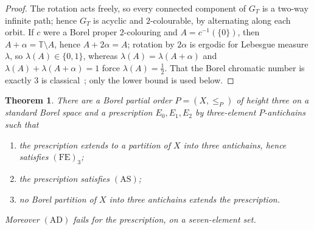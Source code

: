 \documentclass[11pt,reqno]{amsart}
\theoremstyle{plain}
\newtheorem{theorem}{Theorem}[section]
\theoremstyle{definition}
\theoremstyle{remark}
\newcommand{\T}{\mathbb T}
\begin{document}
\begin{proof}
The rotation acts freely, so every connected component of $G_T$ is a two-way
infinite path; hence $G_T$ is acyclic and $2$-colourable, by alternating along
each orbit. If $c$ were a Borel proper $2$-colouring and $A=c^{-1}(\{0\})$,
then $A+\alpha=\T\setminus A$, hence $A+2\alpha=A$; rotation by $2\alpha$ is
ergodic for Lebesgue measure $\lambda$, so $\lambda(A)\in\{0,1\}$, whereas
$\lambda(A)=\lambda(A+\alpha)$ and $\lambda(A)+\lambda(A+\alpha)=1$ force
$\lambda(A)=\tfrac12$. That the Borel chromatic number is exactly $3$ is
classical~\cite{KechrisSoleckiTodorcevic1999}; only the lower bound is used
below.
\end{proof}

\begin{theorem}
\label{thm:D}
There are a Borel partial order $P=(X,\le_P)$ of height three on a standard
Borel space and a prescription $E_0,E_1,E_2$ by three-element $P$-antichains
such that
\begin{enumerate}
\item[\textup{(i)}] the prescription extends to a partition of $X$ into
three antichains, hence satisfies $\mathrm{(FE)}_3$;
\item[\textup{(ii)}] the prescription satisfies $\mathrm{(AS)}$;
\item[\textup{(iii)}] no \emph{Borel} partition of $X$ into three antichains
extends the prescription.
\end{enumerate}
Moreover $\mathrm{(AD)}$ fails for the prescription, on a seven-element set.
\end{theorem}
\end{document}
